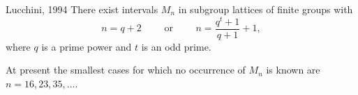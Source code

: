\begin{theorem}
{Lucchini, 1994} There exist intervals $M_n$ in subgroup lattices
of finite groups with
\[
n = q + 2 \qquad \text{ or } \qquad n =
\frac{q^t + 1}{q + 1}+ 1,\]
where $q$ is a prime power and $t$ is an odd prime.
\end{theorem}
At present the smallest cases for which no occurrence of $M_n$ is known are $n = 16,
23, 35, \dots$.
